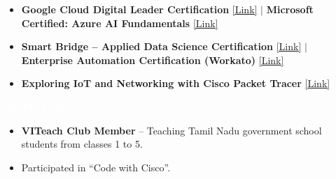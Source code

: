 \documentclass[10pt,a4paper]{article}
\newcommand{\resumesection}[1]{%
    \vspace{2pt}
    \noindent
    \colorbox{sectionblack}{%
        \parbox{\dimexpr\linewidth-2\fboxsep\relax}{%
            \centering
            \textcolor{white}{\textbf{\normalsize #1}}
        }%
    }%
    \vspace{1pt}
}
\begin{document}
\begin{itemize}[itemsep=1pt]

\item \textbf{Google Cloud Digital Leader Certification}
\hspace{2pt}
\href{https://www.credly.com/badges/85e1602f-c8c9-49d6-98ad-3ba8ffd6158c/public_url}{\textcolor{linkblue}{[Link]}}
\quad $\vert$ \quad
\textbf{Microsoft Certified: Azure AI Fundamentals}
\hspace{2pt}
\href{https://www.credly.com/badges/f3268f60-72dd-479e-8951-a86833a0c7db/linked_in_profile}{\textcolor{linkblue}{[Link]}}

\item \textbf{Smart Bridge -- Applied Data Science Certification}
\hspace{2pt}
\href{https://smartinternz.com/internships/google_developers/df98c1a05903d0856f19af13ea5b755d}{\textcolor{linkblue}{[Link]}}
\quad $\vert$ \quad
\textbf{Enterprise Automation Certification (Workato)}
\hspace{2pt}
\href{https://credentials.workato.com/8675fbe8-7a3e-4df6-920e-e5d8fe1ad756#acc.e9kg4c2V}{\textcolor{linkblue}{[Link]}}

\item \textbf{Exploring IoT and Networking with Cisco Packet Tracer}
\hspace{2pt}
\href{https://www.credly.com/badges/e723b676-1eb0-43d6-8ccd-1c8b905dddff/linked_in_profile}{\textcolor{linkblue}{[Link]}}

\end{itemize}


\resumesection{ACTIVITIES}

\begin{itemize}

\item \textbf{VITeach Club Member} -- Teaching Tamil Nadu government school students from classes 1 to 5.

\item Participated in ``Code with Cisco''.

\end{itemize}
\end{document}
